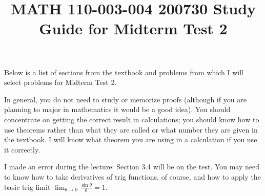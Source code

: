 \documentclass[11pt]{article}
\title{MATH 110-003-004 200730 Study Guide for Midterm Test 2}
\author{\commonAuthor}
\date{\commonDateMTTwo}
\newcommand{\ds}{\displaystyle}
\begin{document}
\maketitle

Below is a list of sections from the textbook and problems from which
I will select problems for Midterm Test 2.

In general, you do not need to study or memorize proofs (although if
you are planning to major in mathematics it would be a good idea).
You should concentrate on getting the correct result in calculations;
you should know how to use theorems rather than what they are called
or what number they are given in the textbook.  I will know what
theorem you are using in a calculation if you use it correctly.

I made an error during the lecture: Section 3.4 will be on the test.
You may need to know how to take derivatives of trig functions, of
course, and how to apply the basic trig limit
$\ds\lim_{\theta\to 0} \frac{\sin\theta}{\theta} = 1$.
\end{document}

